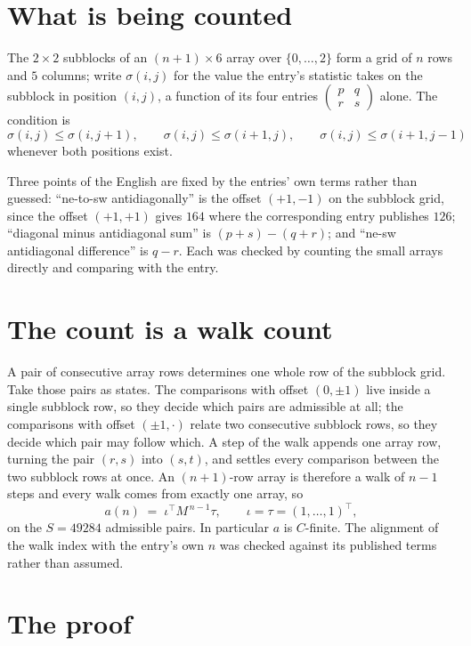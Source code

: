 \documentclass[11pt,a4paper]{article}
\theoremstyle{plain}
\theoremstyle{definition}
\begin{document}
\section{What is being counted}

The $2\times2$ subblocks of an $(n+1)\times6$ array over $\{0,\dots,2\}$ form a grid
of $n$ rows and $5$ columns; write $\sigma(i,j)$ for the value the entry's statistic takes on
the subblock in position $(i,j)$, a function of its four entries
$\begin{pmatrix}p&q\\r&s\end{pmatrix}$ alone. The condition is
\[
\sigma(i,j)\le\sigma(i,j+1),\qquad \sigma(i,j)\le\sigma(i+1,j),\qquad \sigma(i,j)\le\sigma(i+1,j-1)
\]
whenever both positions exist.

Three points of the English are fixed by the entries' own terms rather than guessed:
``ne-to-sw antidiagonally'' is the offset $(+1,-1)$ on the subblock grid, since the offset
$(+1,+1)$ gives $164$ where the corresponding entry publishes $126$; ``diagonal minus
antidiagonal sum'' is $(p+s)-(q+r)$; and ``ne-sw antidiagonal difference'' is $q-r$. Each was
checked by counting the small arrays directly and comparing with the entry.

\section{The count is a walk count}

A pair of consecutive array rows determines one whole row of the subblock grid. Take those
pairs as states. The comparisons with offset $(0,\pm1)$ live inside a single subblock row, so
they decide which pairs are admissible at all; the comparisons with offset $(\pm1,\cdot)$
relate two consecutive subblock rows, so they decide which pair may follow which. A step of the
walk appends one array row, turning the pair $(r,s)$ into $(s,t)$, and settles every comparison
between the two subblock rows at once. An $(n+1)$-row array is therefore a walk of $n-1$ steps
and every walk comes from exactly one array, so
\[
a(n)\;=\;\iota^{\!\top}M^{\,n-1}\tau,\qquad \iota=\tau=(1,\dots,1)^{\!\top},
\]
on the $S=49284$ admissible pairs. In particular $a$ is $C$-finite. The alignment of the walk
index with the entry's own $n$ was checked against its published terms rather than assumed.

\section{The proof}
\end{document}
